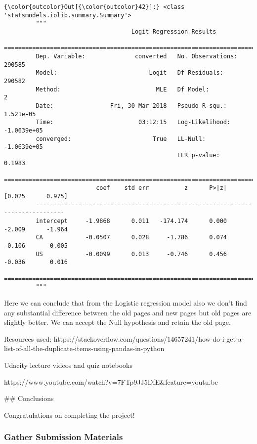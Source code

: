\documentclass[11pt]{article}
\begin{document}
\begin{Verbatim}[commandchars=\\\{\}]
{\color{outcolor}Out[{\color{outcolor}42}]:} <class 'statsmodels.iolib.summary.Summary'>
         """
                                    Logit Regression Results                           
         ==============================================================================
         Dep. Variable:              converted   No. Observations:               290585
         Model:                          Logit   Df Residuals:                   290582
         Method:                           MLE   Df Model:                            2
         Date:                Fri, 30 Mar 2018   Pseudo R-squ.:               1.521e-05
         Time:                        03:12:15   Log-Likelihood:            -1.0639e+05
         converged:                       True   LL-Null:                   -1.0639e+05
                                                 LLR p-value:                    0.1983
         ==============================================================================
                          coef    std err          z      P>|z|      [0.025      0.975]
         ------------------------------------------------------------------------------
         intercept     -1.9868      0.011   -174.174      0.000      -2.009      -1.964
         CA            -0.0507      0.028     -1.786      0.074      -0.106       0.005
         US            -0.0099      0.013     -0.746      0.456      -0.036       0.016
         ==============================================================================
         """
\end{Verbatim}
            
    Here we can conclude that from the Logistic regression model also we
don't find any substantial difference between the old pages and new
pages but old pages are slightly better. We can accept the Null
hypothesis and retain the old page.

    Resources used:
https://stackoverflow.com/questions/14657241/how-do-i-get-a-list-of-all-the-duplicate-items-using-pandas-in-python

Udacity lecture videos and quiz notebooks

https://www.youtube.com/watch?v=7FTp9JJ5DfE\&feature=youtu.be

     \#\# Conclusions

Congratulations on completing the project!

\hypertarget{gather-submission-materials}{%
\subsubsection{Gather Submission
Materials}\label{gather-submission-materials}}
\end{document}

